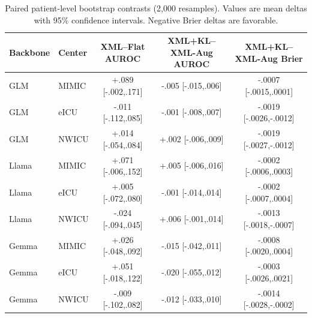 \begin{table}[t]
\caption{Paired patient-level bootstrap contrasts (2,000 resamples). Values are mean deltas with 95\% confidence intervals. Negative Brier deltas are favorable.}
\label{tab:bootstrap}
\centering
\scriptsize
\setlength{\tabcolsep}{4.0pt}
\begin{tabular}{llccc}
\toprule
Backbone & Center & XML--Flat AUROC & XML+KL--XML-Aug AUROC & XML+KL--XML-Aug Brier \\
\midrule
GLM & MIMIC & +.089 [-.002,.171] & -.005 [-.015,.006] & -.0007 [-.0015,.0001] \\
GLM & eICU  & -.011 [-.112,.085] & -.001 [-.008,.007] & -.0019 [-.0026,-.0012] \\
GLM & NWICU & +.014 [-.054,.084] & +.002 [-.006,.009] & -.0019 [-.0027,-.0012] \\
Llama & MIMIC & +.071 [-.006,.152] & +.005 [-.006,.016] & -.0002 [-.0006,.0003] \\
Llama & eICU  & +.005 [-.072,.080] & -.001 [-.014,.014] & -.0002 [-.0007,.0004] \\
Llama & NWICU & -.024 [-.094,.045] & +.006 [-.001,.014] & -.0013 [-.0018,-.0007] \\
Gemma & MIMIC & +.026 [-.048,.092] & -.015 [-.042,.011] & -.0008 [-.0020,.0004] \\
Gemma & eICU  & +.051 [-.018,.122] & -.020 [-.055,.012] & -.0003 [-.0026,.0021] \\
Gemma & NWICU & -.009 [-.102,.082] & -.012 [-.033,.010] & -.0014 [-.0028,-.0002] \\
\bottomrule
\end{tabular}
\end{table}
